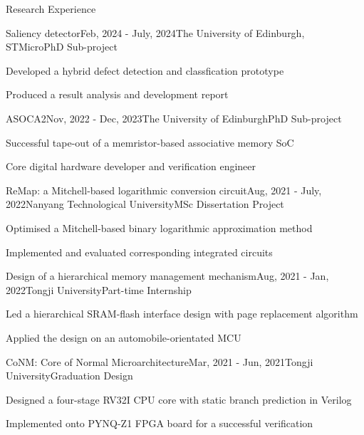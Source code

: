 \documentclass{resume} %
\begin{document}
\begin{rSection}{Research Experience}
	
	\begin{rSubsection}{Saliency detector}{Feb, 2024 - July, 2024}{The University of Edinburgh, STMicro}{PhD Sub-project}
		\item Developed a hybrid defect detection and classfication prototype
		\item Produced a result analysis and development report
	\end{rSubsection}
	
	\begin{rSubsection}{ASOCA2}{Nov, 2022 - Dec, 2023}{The University of Edinburgh}{PhD Sub-project}
		\item Successful tape-out of a memristor-based associative memory SoC
		\item Core digital hardware developer and verification engineer
	\end{rSubsection}
	
	\begin{rSubsection}{ReMap: a Mitchell-based logarithmic conversion circuit}{Aug, 2021 - July, 2022}{Nanyang Technological University}{MSc Dissertation Project}
		\item Optimised a Mitchell-based binary logarithmic approximation method
		\item Implemented and evaluated corresponding integrated circuits
	\end{rSubsection}

	\begin{rSubsection}{Design of a hierarchical memory management mechanism}{Aug, 2021 - Jan, 2022}{Tongji University}{Part-time Internship}
		\item Led a hierarchical SRAM-flash interface design with page replacement algorithm
		\item Applied the design on an automobile-orientated MCU
	\end{rSubsection}
	
	\begin{rSubsection}{CoNM: Core of Normal Microarchitecture}{Mar, 2021 - Jun, 2021}{Tongji University}{Graduation Design}
		\item Designed a four-stage RV32I CPU core with static branch prediction in Verilog
		\item Implemented onto PYNQ-Z1 FPGA board for a successful verification
	\end{rSubsection}

\end{rSection}
\end{document}
